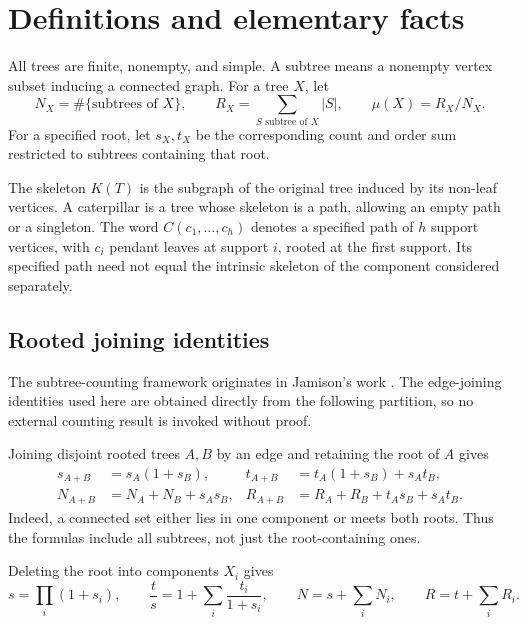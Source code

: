 \documentclass[11pt,letterpaper]{article}
\theoremstyle{plain}
\begin{document}
\section{Definitions and elementary facts}\label{definitions-and-elementary-facts}

All trees are finite, nonempty, and simple. A subtree means a nonempty vertex subset inducing a connected graph. For a tree \(X\), let \[
N_X=\#\{\text{subtrees of }X\},\qquad
R_X=\sum_{S\text{ subtree of }X}|S|,\qquad
\mu(X)=R_X/N_X.
\] For a specified root, let \(s_X,t_X\) be the corresponding count and order sum restricted to subtrees containing that root.

The skeleton \(K(T)\) is the subgraph of the original tree induced by its non-leaf vertices. A caterpillar is a tree whose skeleton is a path, allowing an empty path or a singleton. The word \(C(c_1,\ldots,c_h)\) denotes a specified path of \(h\) support vertices, with \(c_i\) pendant leaves at support \(i\), rooted at the first support. Its specified path need not equal the intrinsic skeleton of the component considered separately.

\subsection{Rooted joining identities}\label{rooted-joining-identities}
The subtree-counting framework originates in Jamison's work \cite{Jamison1983,Jamison1984}. The edge-joining identities used here are obtained directly from the following partition, so no external counting result is invoked without proof.


Joining disjoint rooted trees \(A,B\) by an edge and retaining the root of \(A\) gives \[
\begin{aligned}
s_{A+B}&=s_A(1+s_B),&
t_{A+B}&=t_A(1+s_B)+s_At_B,\\
N_{A+B}&=N_A+N_B+s_As_B,&
R_{A+B}&=R_A+R_B+t_As_B+s_At_B.
\end{aligned}
\tag{1.1}\label{eq:main-1-1}
\] Indeed, a connected set either lies in one component or meets both roots. Thus the formulas include all subtrees, not just the root-containing ones.

Deleting the root into components \(X_i\) gives \[
s=\prod_i(1+s_i),\qquad
\frac ts=1+\sum_i\frac{t_i}{1+s_i},\qquad
N=s+\sum_iN_i,\qquad R=t+\sum_iR_i.
\tag{1.2}\label{eq:main-1-2}
\]
\end{document}
